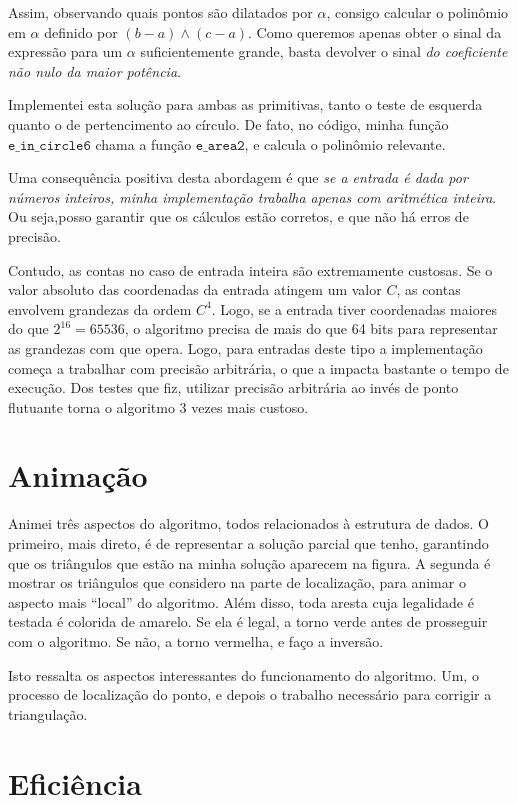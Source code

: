 \documentclass[10pt,reqno,a4paper]{article}
\begin{document}
Assim, observando quais pontos são dilatados por $\alpha$, consigo calcular
o polinômio em $\alpha$ definido por $(b - a) \wedge (c - a)$.  Como queremos
apenas obter o sinal da expressão para um $\alpha$ suficientemente grande,
basta devolver o sinal \emph{do coeficiente não nulo da maior potência}.

Implementei esta solução para ambas as primitivas, tanto o teste de esquerda
quanto o de pertencimento ao círculo.  De fato, no código, minha função
$\texttt{e\_in\_circle6}$ chama a função $\texttt{e\_area2}$, e calcula
o polinômio relevante.

Uma consequência positiva desta abordagem é que \emph{se a entrada é
dada por números inteiros, minha implementação trabalha apenas com
aritmética inteira}. Ou seja,posso garantir que os cálculos estão corretos,
e que não há erros de precisão.

Contudo, as contas no caso de entrada inteira são extremamente custosas. Se
o valor absoluto das coordenadas da entrada atingem um valor $C$, as contas
envolvem grandezas da ordem $C^4$. Logo, se a entrada tiver coordenadas
maiores do que $2^{16} = 65536$, o algoritmo precisa de mais do que 64
bits para representar as grandezas com que opera. Logo, para entradas deste
tipo a implementação começa a trabalhar com precisão arbitrária, o que a
impacta bastante o tempo de execução. Dos testes que fiz, utilizar precisão
arbitrária ao invés de ponto flutuante torna o algoritmo 3 vezes mais custoso.

\section{Animação}

Animei três aspectos do algoritmo, todos relacionados à estrutura de dados. O primeiro,
mais direto, é de representar a solução parcial que tenho, garantindo que os triângulos
que estão na minha solução aparecem na figura. A segunda é mostrar os triângulos que
considero na parte de localização, para animar o aspecto mais ``local'' do algoritmo.
Além disso, toda aresta cuja legalidade é testada é colorida de amarelo. Se ela é legal,
a torno verde antes de prosseguir com o algoritmo. Se não, a torno vermelha, e faço
a inversão.

Isto ressalta os aspectos interessantes do funcionamento do algoritmo. Um, o
processo de localização do ponto, e depois o trabalho necessário para corrigir a
triangulação.

\section{Eficiência}
\end{document}
